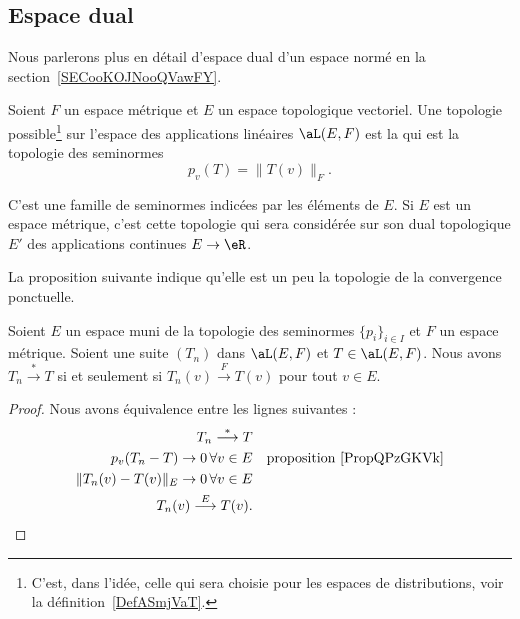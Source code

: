 \subsection{Espace dual}

Nous parlerons plus en détail d'espace dual d'un espace normé en la section~\ref{SECooKOJNooQVawFY}.

\begin{definition}  \label{DefHUelCDD}
	Soient \( F\) un espace métrique et \( E\) un espace topologique vectoriel. Une topologie possible\footnote{C'est, dans l'idée, celle qui sera choisie pour les espaces de distributions, voir la définition~\ref{DefASmjVaT}.} sur l'espace des applications linéaires \( \aL(E,F)\) est la  qui est la topologie des seminormes
	\begin{equation}
		p_v(T)=\| T(v) \|_F.
	\end{equation}
\end{definition}
C'est une famille de seminormes indicées par les éléments de \( E\). Si \( E\) est un espace métrique, c'est cette topologie qui sera considérée sur son dual topologique \( E'\) des applications continues \( E\to \eR\).

La proposition suivante indique qu'elle est un peu la topologie de la convergence ponctuelle.
\begin{proposition}
	Soient \( E\) un espace muni de la topologie des seminormes \( \{ p_i \}_{i\in I}\) et \( F\) un espace métrique. Soient une suite \( (T_n)\) dans \( \aL(E,F)\) et \( T\in \aL(E,F)\). Nous avons \( T_n\stackrel{*}{\longrightarrow}T\) si et seulement si \( T_n(v)\stackrel{F}{\longrightarrow}T(v)\) pour tout \( v\in E\).
\end{proposition}

\begin{proof}
	Nous avons équivalence entre les lignes suivantes :
	\begin{subequations}
		\begin{align}
			T_n\stackrel{*}{\longrightarrow}T                                         \\
			p_v(T_n-T)\to 0\,\forall v\in E &  & \text{proposition~\ref{PropQPzGKVk}} \\
			\| T_n(v)-T(v) \|_E\to 0\,\forall v\in E                                  \\
			T_n(v)\stackrel{E}{\longrightarrow}T(v).
		\end{align}
	\end{subequations}
\end{proof}

